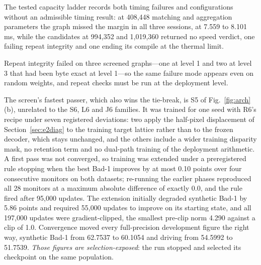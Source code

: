 \documentclass[sigconf,review,anonymous]{acmart}
\begin{document}
The tested capacity ladder records both timing failures and configurations without an admissible timing result: at 408,448 matching and aggregation parameters the graph missed the margin in all three sessions, at 7.559 to 8.101 ms, while the candidates at 994,352 and 1,019,360 returned no speed verdict, one failing repeat integrity and one ending its compile at the thermal limit.

Repeat integrity failed on three screened graphs---one at level 1 and two at level 3 that had been byte exact at level 1---so the same failure mode appears even on random weights, and repeat checks must be run at the deployment level.



The screen's fastest passer, which also wins the tie-break, is S5 of Fig.~\ref{fig:arch}(b), unrelated to the S6, L6 and J6 families. It was trained for one seed with R6's recipe under seven registered deviations: two apply the half-pixel displacement of Section~\ref{sec:e2diag} to the training target lattice rather than to the frozen decoder, which stays unchanged, and the others include a wider training disparity mask, no retention term and no dual-path training of the deployment arithmetic. A first pass was not converged, so training was extended under a preregistered rule stopping when the best Bad-1 improves by at most 0.10 points over four consecutive monitors on both datasets; re-running the earlier phases reproduced all 28 monitors at a maximum absolute difference of exactly 0.0, and the rule fired after 95,000 updates. The extension initially degraded synthetic Bad-1 by 5.86 points and required 55,000 updates to improve on its starting state, and all 197,000 updates were gradient-clipped, the smallest pre-clip norm 4.290 against a clip of 1.0. Convergence moved every full-precision development figure the right way, synthetic Bad-1 from 62.7537 to 60.1054 and driving from 54.5992 to 51.7539. \emph{Those figures are selection-exposed}: the run stopped and selected its checkpoint on the same population.
\end{document}
